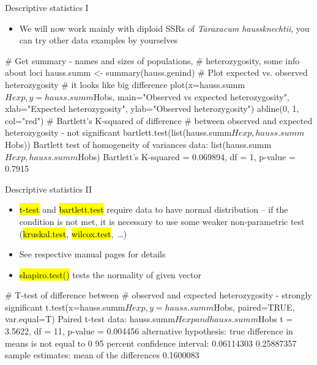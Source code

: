 \documentclass[compress, ucs, xelatex, 11pt, xcolor=svgnames,
  hyperref={
    bookmarks=true,
    unicode=true,
    colorlinks=true,
    pdftitle={Molecular data in R},
    plainpages=false,
    pdfauthor={Vojtech Zeisek},
    pdfsubject={Course about phylogeny and evolution in R},
    pdfcreator={XeLaTeX},
    pdfkeywords={R, evolution, phylogeny, molecular data},
    linkcolor=Tomato,
    anchorcolor=SaddleBrown,
    citecolor=Goldenrod,
    filecolor=DarkMagenta,
    menucolor=Sienna,
    urlcolor=DarkTurquoise,
    pdftex},
  url={hyphens, lowtilde} %
  ]{beamer}
\renewcommand{\texttt}[1]{\hl{\ttfamily #1}}
\begin{document}
\begin{frame}[fragile]{Descriptive statistics I}
  \label{popgenindx}
  \begin{itemize}
    \item We will now work mainly with diploid SSRs of \textit{Taraxacum haussknechtii}, you can try other data examples by yourselves
  \end{itemize}
  \begin{spluscode}
    # Get summary - names and sizes of populations,
    # heterozygosity, some info about loci
    hauss.summ <- summary(hauss.genind)
    # Plot expected vs. observed heterozygosity
    # it looks like big difference
    plot(x=hauss.summ$Hexp, y=hauss.summ$Hobs,
      main="Observed vs expected heterozygosity",
      xlab="Expected heterozygosity", ylab="Observed heterozygosity")
    abline(0, 1, col="red")
    # Bartlett's K-squared of difference
    # between observed and expected heterozygosity - not significant
    bartlett.test(list(hauss.summ$Hexp, hauss.summ$Hobs))
                  Bartlett test of homogeneity of variances
    data:  list(hauss.summ$Hexp, hauss.summ$Hobs)
    Bartlett's K-squared = 0.069894, df = 1, p-value = 0.7915
  \end{spluscode}
\end{frame}

\begin{frame}[fragile]{Descriptive statistics II}
  \begin{itemize}
    \item \texttt{t-test} and \texttt{bartlett.test} require data to have normal distribution -- if the condition is not met, it is necessary to use some weaker non-parametric test (\texttt{kruskal.test}, \texttt{wilcox.test},~\ldots)
    \item See respective manual pages for details
    \item \texttt{shapiro.test()} tests the normality of given vector
  \end{itemize}
  \begin{spluscode}
    # T-test of difference between
    # observed and expected heterozygosity - strongly significant
    t.test(x=hauss.summ$Hexp, y=hauss.summ$Hobs, paired=TRUE, var.equal=T)
                 Paired t-test
    data:  hauss.summ$Hexp and hauss.summ$Hobs
    t = 3.5622, df = 11, p-value = 0.004456
    alternative hypothesis: true difference in means is not equal to 0
    95 percent confidence interval:
     0.06114303 0.25887357
    sample estimates:
    mean of the differences
                  0.1600083
  \end{spluscode}
\end{frame}
\end{document}
